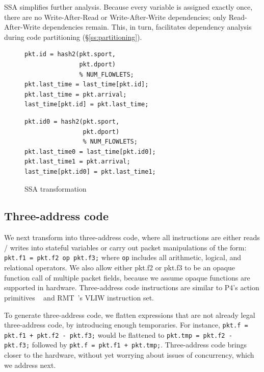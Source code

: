 SSA simplifies further analysis. Because every variable is assigned exactly
once, there are no Write-After-Read or Write-After-Write dependencies; only
Read-After-Write dependencies remain. This, in turn, facilitates dependency analysis
during code partitioning (\S\ref{ss:partitioning}).

\begin{figure}[!h]
  \begin{minipage}{0.48\columnwidth}
  \begin{small}
  \begin{lstlisting}[style=customc]
pkt.id = hash2(pkt.sport,
               pkt.dport)
               % NUM_FLOWLETS;
pkt.last_time = last_time[pkt.id];
pkt.last_time = pkt.arrival;
last_time[pkt.id] = pkt.last_time;
  \end{lstlisting}
  \end{small}
  \end{minipage}
  \begin{minipage}{0.52\columnwidth}
  \begin{small}
  \begin{lstlisting}[style=customc]
pkt.id0 = hash2(pkt.sport,
                pkt.dport)
                % NUM_FLOWLETS;
pkt.last_time0 = last_time[pkt.id0];
pkt.last_time1 = pkt.arrival;
last_time[pkt.id0] = pkt.last_time1;
  \end{lstlisting}
  \end{small}
  \end{minipage}
  \caption{SSA transformation}
\label{fig:ssa}
\end{figure}

\subsection{Three-address code}
We next transform into three-address code, where all instructions are either
reads / writes into stateful variables or carry out packet manipulations of the
form: \texttt{pkt.f1 = pkt.f2 op pkt.f3;} where \texttt{op} includes all
arithmetic, logical, and relational operators. We also allow either pkt.f2 or
pkt.f3 to be an opaque function call of multiple packet fields, because we
assume opaque functions are supported in hardware. Three-address code
instructions are similar to P4's action primitives ~\cite{p4spec} and
RMT~\cite{rmt}'s VLIW instruction set.

To generate three-address code, we flatten expressions that are not already
legal three-address code, by introducing enough temporaries. For instance,
\texttt{pkt.f = pkt.f1 + pkt.f2 - pkt.f3;} would be flattened to
\texttt{pkt.tmp = pkt.f2 - pkt.f3;} followed by \texttt{pkt.f = pkt.f1 +
pkt.tmp;}. Three-address code brings \pktlanguage closer to the hardware,
without yet worrying about issues of concurrency, which we address next.


